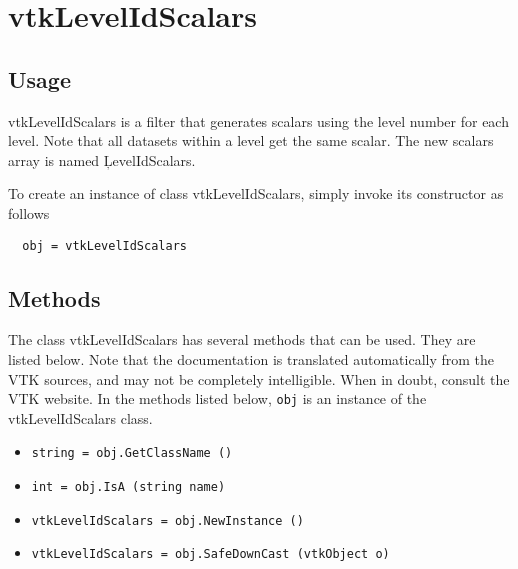 \section{vtkLevelIdScalars}

\subsection{Usage}

 vtkLevelIdScalars is a filter that generates scalars using the level number
 for each level. Note that all datasets within a level get the same scalar.
 The new scalars array is named \c LevelIdScalars.

To create an instance of class vtkLevelIdScalars, simply
invoke its constructor as follows
\begin{verbatim}
  obj = vtkLevelIdScalars
\end{verbatim}
\subsection{Methods}

The class vtkLevelIdScalars has several methods that can be used.
  They are listed below.
Note that the documentation is translated automatically from the VTK sources,
and may not be completely intelligible.  When in doubt, consult the VTK website.
In the methods listed below, \verb|obj| is an instance of the vtkLevelIdScalars class.
\begin{itemize}
\item  \verb|string = obj.GetClassName ()|

\item  \verb|int = obj.IsA (string name)|

\item  \verb|vtkLevelIdScalars = obj.NewInstance ()|

\item  \verb|vtkLevelIdScalars = obj.SafeDownCast (vtkObject o)|

\end{itemize}

